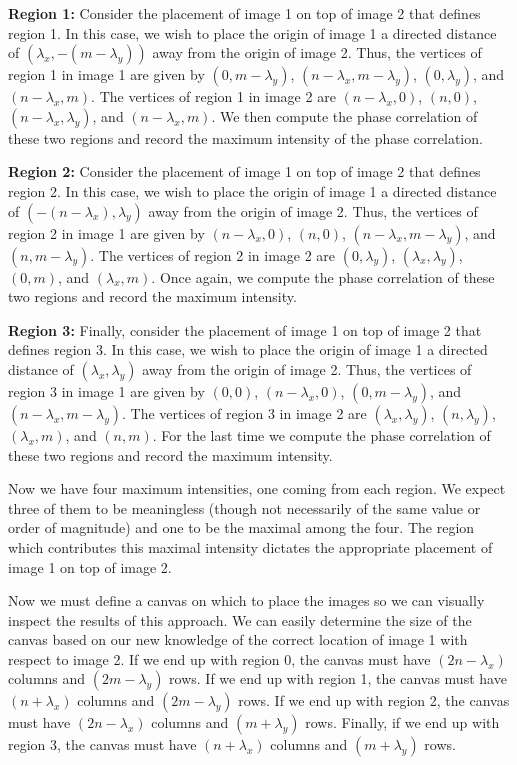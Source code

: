 \documentclass[]{article}
\begin{document}
\vskip 5pt

\textbf{Region 1:} Consider the placement of image 1 on top of image 2 that defines region 1. In this case, we wish to place the origin of image 1 a directed distance of $(\lambda_x,-{(m-\lambda_y)})$ away from the origin of image 2. Thus, the vertices of region 1 in image 1 are given by $(0,m-\lambda_y)$, $(n-\lambda_x,m-\lambda_y)$, $(0,\lambda_y)$, and $(n-\lambda_x,m)$. The vertices of region 1 in image 2 are $(n-\lambda_x,0)$, $(n,0)$, $(n-\lambda_x, \lambda_y)$, and $(n-\lambda_x,m)$. We then compute the phase correlation of these two regions and record the maximum intensity of the phase correlation.

\vskip 5pt

\textbf{Region 2:} Consider the placement of image 1 on top of image 2 that defines region 2. In this case, we wish to place the origin of image 1 a directed distance of $(-(n-\lambda_x),\lambda_y)$ away from the origin of image 2. Thus, the vertices of region 2 in image 1 are given by $(n-\lambda_x,0)$, $(n,0)$, $(n-\lambda_x,m-\lambda_y)$, and $(n,m-\lambda_y)$. The vertices of region 2 in image 2 are $(0,\lambda_y)$, $(\lambda_x,\lambda_y)$, $(0,m)$, and $(\lambda_x,m)$. Once again, we compute the phase correlation of these two regions and record the maximum intensity.

\vskip 5pt

\textbf{Region 3:} Finally, consider the placement of image 1 on top of image 2 that defines region 3. In this case, we wish to place the origin of image 1 a directed distance of $(\lambda_x,\lambda_y)$ away from the origin of image 2. Thus, the vertices of region 3 in image 1 are given by $(0,0)$, $(n-\lambda_x,0)$, $(0,m-\lambda_y)$, and $(n-\lambda_x,m-\lambda_y)$. The vertices of region 3 in image 2 are $(\lambda_x,\lambda_y)$, $(n,\lambda_y)$, $(\lambda_x,m)$, and $(n,m)$. For the last time we compute the phase correlation of these two regions and record the maximum intensity.

Now we have four maximum intensities, one coming from each region. We expect three of them to be meaningless (though not necessarily of the same value or order of magnitude) and one to be the maximal among the four. The region which contributes this maximal intensity dictates the appropriate placement of image 1 on top of image 2. 

Now we must define a canvas on which to place the images so we can visually inspect the results of this approach. We can easily determine the size of the canvas based on our new knowledge of the correct location of image 1 with respect to image 2. If we end up with region 0, the canvas must have $(2n-\lambda_x)$ columns and $(2m-\lambda_y)$ rows. If we end up with region 1, the canvas must have $(n+\lambda_x)$ columns and $(2m-\lambda_y)$ rows. If we end up with region 2, the canvas must have $(2n-\lambda_x)$ columns and $(m+\lambda_y)$ rows. Finally, if we end up with region 3, the canvas must have $(n+\lambda_x)$ columns and $(m+\lambda_y)$ rows. 
\end{document}
